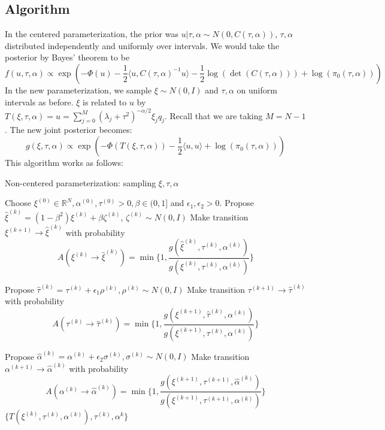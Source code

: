 \documentclass{siamart1116}
\begin{document}
\subsection{Algorithm}
In the centered parameterization, the prior was $u|\tau,\alpha \sim N(0, C(\tau, \alpha))$, $\tau, \alpha$ distributed independently and uniformly over intervals. We would take the posterior by Bayes' theorem to be
\[f(u,\tau,\alpha) \propto \exp\left(-\Phi(u) -\frac{1}{2}\langle u, C(\tau,\alpha)^{-1}u \rangle - \frac{1}{2}\log(\det(C(\tau,\alpha))) + \log(\pi_0(\tau,\alpha))\right) \]
In the new parameterization, we sample $\xi \sim N(0, I)$ and $\tau, \alpha$ on uniform intervals as before. $\xi$ is related to $u$ by $T(\xi,\tau,\alpha) = u = \sum_{j=0}^{M}(\lambda_j+\tau^2)^{-\alpha/2}\xi_jq_j$. Recall that we are taking $M=N-1$. The new joint posterior becomes:
\[ g(\xi,\tau,\alpha) \propto \exp\left( -\Phi(T(\xi,\tau,\alpha))-\frac{1}{2}\langle u,u \rangle + \log(\pi_0(\tau,\alpha)) \right)\]
This algorithm works as follows:
\begin{algorithm}
\caption{Non-centered parameterization: sampling $\xi, \tau, \alpha$}
\label{alg:xi_tau_alpha}
\begin{algorithmic}
\State Choose $\xi^{(0)} \in \mathbb{R}^N, \alpha^{(0)}, \tau^{(0)} > 0, \beta \in (0, 1]$ and $\epsilon_1, \epsilon_2 > 0$.
\State Propose $\hat\xi^{(k)} = (1-\beta^2)\xi^{(k)} + \beta \zeta^{(k)}$, $\zeta^{(k)} \sim N(0, I)$
\State Make transition $\xi^{(k+1)} \to \hat\xi^{(k)}$ with probability
\[ A(\xi^{(k)} \to \hat\xi^{(k)}) = \min\{1, \frac{g(\hat\xi^{(k)},\tau^{(k)},\alpha^{(k)})}{g(\xi^{(k)},\tau^{(k)},\alpha^{(k)})} \}\]

\State Propose $\hat\tau^{(k)} = \tau^{(k)} + \epsilon_1 \rho^{(k)}, \rho^{(k)} \sim N(0,I)$
\State Make transition $\tau^{(k+1)} \to \hat\tau^{(k)}$ with probability
\[ A(\tau^{(k)} \to \hat\tau^{(k)}) = \min\{1, \frac{g(\xi^{(k+1)},\hat\tau^{(k)},\alpha^{(k)})}{g(\xi^{(k+1)},\tau^{(k)},\alpha^{(k)})} \}\]

\State Propose $\hat\alpha^{(k)} = \alpha^{(k)} + \epsilon_2 \sigma^{(k)}, \sigma^{(k)} \sim N(0,I)$
\State Make transition $\alpha^{(k+1)} \to \hat\alpha^{(k)}$ with probability
\[ A(\alpha^{(k)} \to \hat\alpha^{(k)}) = \min\{1, \frac{g(\xi^{(k+1)},\tau^{(k+1)},\hat \alpha^{(k)})}{g(\xi^{(k+1)},\tau^{(k+1)},\alpha^{(k)})} \}\]
\EndFor
\State \Return $\{ T(\xi^{(k)},\tau^{(k)},\alpha^{(k)}), \tau^{(k)}, \alpha^{k} \}$
\end{algorithmic}
\end{algorithm}
\end{document}
